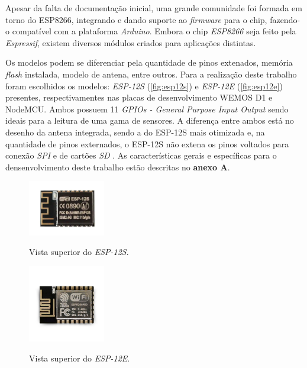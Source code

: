 Apesar da falta de documentação inicial, uma grande comunidade foi formada em
torno do ESP8266, integrando e dando suporte ao \textit{firmware} para o chip, fazendo-o compatível com a plataforma \textit{Arduino}.
Embora o chip \textit{ESP8266} seja feito pela \textit{Espressif}, existem diversos módulos criados para aplicações distintas.

Os modelos podem se diferenciar pela quantidade de pinos extenados, memória \textit{flash} instalada, modelo de antena, entre outros. Para a realização deste trabalho foram escolhidos os modelos: \textit{ESP-12S} (\autoref{fig:esp12s}) e \textit{ESP-12E} (\autoref{fig:esp12e}) presentes, respectivamentes nas placas de desenvolvimento WEMOS D1 e NodeMCU. Ambos possuem 11 \textit{GPIOs - General Purpose Input Output} sendo ideais para a leitura de uma gama de sensores. A diferença entre ambos está no desenho da antena integrada, sendo a do ESP-12S mais otimizada e, na quantidade de pinos externados, o ESP-12S não extena os pinos voltados para conexão \textit{SPI} e de cartões \textit{SD} \cite{esp8266}. As características gerais e específicas para o densenvolvimento deste trabalho estão descritas no \textbf{anexo A}. 


\begin{figure}[H]
	\centering
	\caption{Vista superior do \textit{ESP-12S}.}
	\includegraphics[width=0.3\textwidth]{figuras/ESP-12S.png}
	\label{fig:esp12s}
\end{figure} 

\begin{figure}[H]
	\centering
	\caption{Vista superior do \textit{ESP-12E}.}
	\includegraphics[width=0.3\textwidth]{figuras/ESP-12E.png}
	\label{fig:esp12e}
\end{figure}

